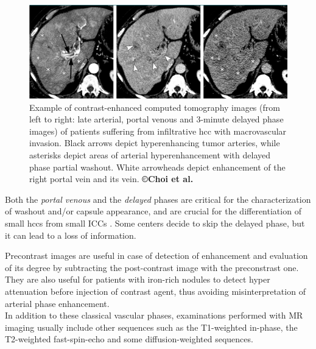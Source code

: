\begin{figure}[th!]
\centering
\includegraphics[width=0.9\linewidth]{images/image15_crop}
\caption{Example of contrast-enhanced computed tomography images (from left to right: late arterial, portal venous and 3-minute delayed phase images) of patients suffering from infiltrative \ac{hcc} with macrovascular invasion. Black arrows depict hyperenhancing tumor arteries, while asterisks depict areas of arterial hyperenhancement with delayed phase partial washout. White arrowheads depict enhancement of the right portal vein and its vein. \textbf{©Choi et al. \cite{Choi2014a}}}
\label{Choi2014a_Fig3}
\end{figure}

Both the \emph{portal venous} and the \emph{delayed} phases are critical
for the characterization of washout and/or capsule appearance, and are
crucial for the differentiation of small \ac{hcc}s from small
ICCs \cite{Iannaccone2005,Rimola2009}. Some centers decide
to skip the delayed phase, but it can lead to a loss of information.

Precontrast images are useful in case of detection of enhancement
and evaluation of its degree by subtracting the post-contrast image with
the preconstrast one. They are also useful for patients with iron-rich
nodules to detect hyper attenuation before injection of contrast agent,
thus avoiding misinterpretation of arterial phase enhancement.\\
In addition to these classical vascular phases, examinations performed
with MR imaging usually include other sequences such as the T1-weighted
in-phase, the T2-weighted fast-spin-echo and some diffusion-weighted
sequences.\\




